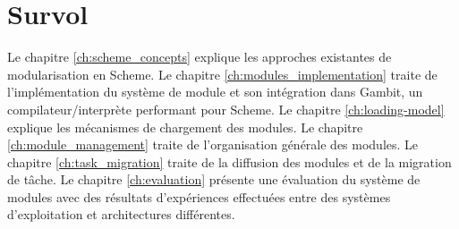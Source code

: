 
\section{Survol}

Le chapitre \ref{ch:scheme_concepts} explique les approches existantes de
modularisation en Scheme.  Le chapitre \ref{ch:modules_implementation}
traite de l'implémentation du système de module et son intégration dans Gambit,
un compilateur/interprète performant pour Scheme. Le chapitre
\ref{ch:loading-model} explique les mécanismes de chargement des modules.  Le
chapitre \ref{ch:module_management} traite de l'organisation générale des
modules. Le chapitre \ref{ch:task_migration} traite de la diffusion des modules
et de la migration de tâche.  Le chapitre \ref{ch:evaluation} présente une
évaluation du système de modules avec des résultats d'expériences effectuées
entre des systèmes d'exploitation et architectures différentes.









